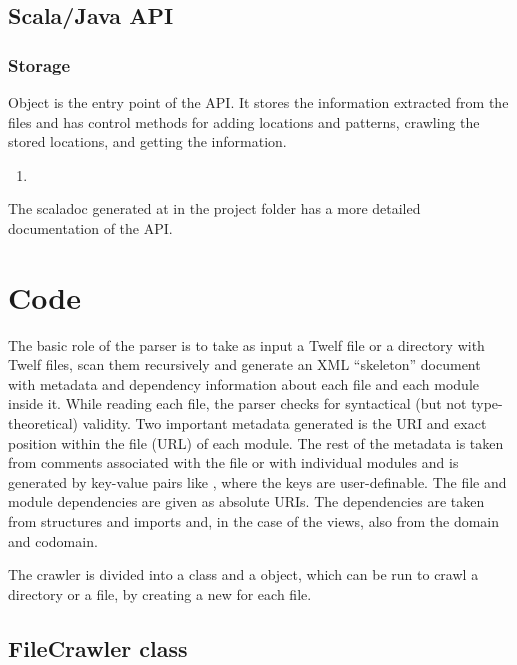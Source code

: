 \subsection{Scala/Java API}

\subsubsection{Storage}

Object  is the entry point of the API. It stores the information extracted from the files and has control methods for adding locations and patterns, crawling the stored locations, and getting the information.
\begin{enumerate}
\item {}
\end{enumerate}
	

The scaladoc generated at  in the project folder has a more detailed documentation of the API.



\section{Code}\label{sec:code}

The basic role of the parser is to take as input a Twelf file or a directory with Twelf files, scan them recursively and generate an XML ``skeleton'' document with metadata and dependency information about each file and each module inside it.  While reading each file, the parser checks for syntactical (but not type-theoretical) validity. Two important metadata generated is the URI and exact position within the file (URL) of each module. The rest of the metadata is taken from comments associated with the file or with individual modules and is generated by key-value pairs like , where the keys are user-definable. The file and module dependencies are given as absolute URIs. The dependencies are taken from structures and imports and, in the case of the views, also from the domain and codomain. 


The crawler is divided into a  class and a  object, which can be run to crawl a directory or a file, by creating a new   for each file.  


\subsection{FileCrawler class}

